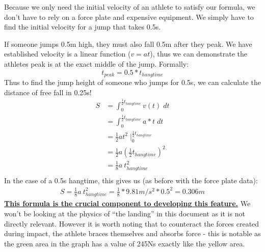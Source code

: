 Because we only need the initial velocity of an athlete to satisfy our formula,
we don't have to rely on a force plate and expensive equipment.
We simply have to find the initial velocity for a jump that takes 0.5s.
\par
If someone jumps 0.5m high, they must also fall 0.5m after they peak. We have established
velocity is a linear function ($v=at$), thus we can demonstrate the athletes peak
is at the exact middle of the jump. Formally:
\vspace{-3mm}
\[
	\displaystyle
	t_{peak} = 0.5 * t_{hangtime}	
\]
Thus to find the jump height of someone who jumps for 0.5s, we can calculate
the distance of free fall in 0.25s!
\[
	\displaystyle
	\begin{aligned}
	S &= \int_0^{\frac{1}{2} t_{hangtime}} v(t) \; dt \\
	&= \int_0^{\frac{1}{2} t_{hangtime}} a * t \; dt \\
	&= \frac{1}{2} a t^2 \; \bigg|_0^{\frac{1}{2}t_{hangtime}} \\
	&= \frac{1}{2} a \left( \frac{1}{2} t_{hangtime} \right)^2 \\
	&= \frac{1}{8} a \: t_{hangtime}^2 \\
	\end{aligned}	
\]
In the case of a 0.5s hangtime, this gives us (as before with the force plate data):
\[
\begin{aligned}
	S = \frac{1}{8} a \: t_{hangtime}^2 = \frac{1}{8} * 9.81m/s^2 * 0.5^2 = 0.306m
\end{aligned}	
\]
\textbf{\underline{This formula is the crucial component to developing this feature.}} 
We won't be looking
at the physics of ``the landing'' in this document as it is not directly relevant.
However it is worth noting that to counteract the forces created during impact,
the athlete braces themselves and absorbs force - this is notable as the green area
in the graph has a value of 245Ns exactly like the yellow area.
\pagebreak

